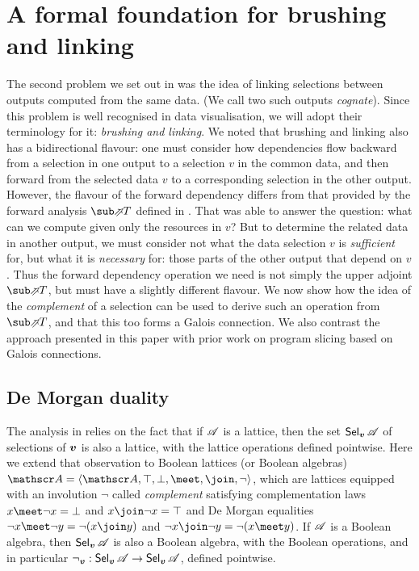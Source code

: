\section{A formal foundation for brushing and linking}
\label{sec:toolkit}

The second problem we set out in  was the idea of linking selections between outputs computed from the same data. (We call two such outputs \emph{cognate}). Since this problem is well recognised in data visualisation, we will adopt their terminology for it: \emph{brushing and linking}. We noted that brushing and linking also has a bidirectional flavour: one must consider how dependencies flow backward from a selection in one output to a selection $v$ in the common data, and then forward from the selected data $v$ to a corresponding selection in the other output. However, the flavour of the forward dependency differs from that provided by the forward analysis $\evalFwdF{T}$ defined in . That was able to answer the question: what can we compute given only the resources in $v$? But to determine the related data in another output, we must consider not what the data selection $v$ is \emph{sufficient} for, but what it is \emph{necessary} for: those parts of the other output that depend on $v$. Thus the forward dependency operation we need is not simply the upper adjoint $\evalFwdF{T}$, but must have a slightly different flavour. We now show how the idea of the \emph{complement} of a selection can be used to derive such an operation from $\evalFwdF{T}$, and that this too forms a Galois connection. We also contrast the approach presented in this paper with prior work on program slicing based on Galois connections.

\subsection{De Morgan duality}


The analysis in  relies on the fact that if $\mathscr{A}$ is a lattice, then the set $\textup{\textsf{Sel}}_{\bm{v}}\,{\mathscr{A}}$ of selections of $\bm{v}$ is also a lattice, with the lattice operations defined pointwise. Here we extend that observation to Boolean lattices (or Boolean algebras) $\Ann{A}= \BoolLattice{\Ann{A}}{\top}{\bot}{\meet}{\join}{\neg}$, which are lattices equipped with an involution $\neg$ called \emph{complement} satisfying complementation laws $x \meet \neg x = \bot$ and $x \join \neg x = \top$ and De Morgan equalities $\neg x \meet \neg y = \neg(x \join y)$ and $\neg x \join \neg y = \neg(x \meet y)$. If $\mathscr{A}$ is a Boolean algebra, then $\textup{\textsf{Sel}}_{\bm{v}}\,{\mathscr{A}}$ is also a Boolean algebra, with the Boolean operations, and in particular $\neg_{\bm{v}}: \textup{\textsf{Sel}}_{\bm{v}}\,{\mathscr{A}} \to \textup{\textsf{Sel}}_{\bm{v}}\,{\mathscr{A}}$, defined pointwise.

